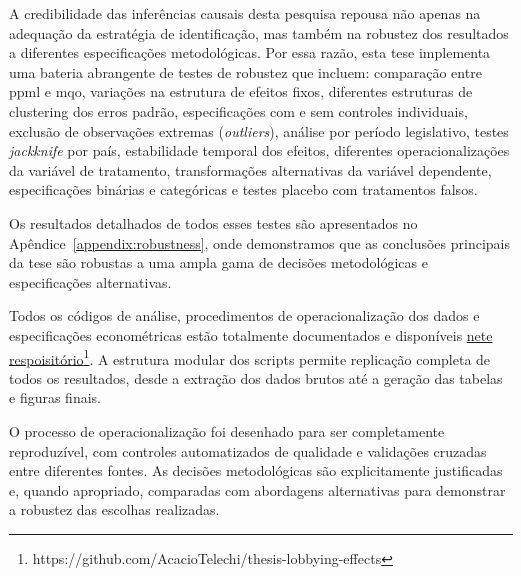 A credibilidade das inferências causais desta pesquisa repousa não apenas na adequação da estratégia de identificação, mas também na robustez dos resultados a diferentes especificações metodológicas. Por essa razão, esta tese implementa uma bateria abrangente de testes de robustez que incluem: comparação entre \acrshort{ppml} e \acrshort{mqo}, variações na estrutura de efeitos fixos, diferentes estruturas de clustering dos erros padrão, especificações com e sem controles individuais, exclusão de observações extremas (\textit{outliers}), análise por período legislativo, testes \textit{jackknife} por país, estabilidade temporal dos efeitos, diferentes operacionalizações da variável de tratamento, transformações alternativas da variável dependente, especificações binárias e categóricas e testes placebo com tratamentos falsos.

Os resultados detalhados de todos esses testes são apresentados no Apêndice~\ref{appendix:robustness}, onde demonstramos que as conclusões principais da tese são robustas a uma ampla gama de decisões metodológicas e especificações alternativas.

Todos os códigos de análise, procedimentos de operacionalização dos dados e especificações econométricas estão totalmente documentados e disponíveis \href{https://github.com/AcacioTelechi/thesis-lobbying-effects}{nete respoisitório}\footnote{https://github.com/AcacioTelechi/thesis-lobbying-effects}. A estrutura modular dos scripts permite replicação completa de todos os resultados, desde a extração dos dados brutos até a geração das tabelas e figuras finais.

O processo de operacionalização foi desenhado para ser completamente reproduzível, com controles automatizados de qualidade e validações cruzadas entre diferentes fontes. As decisões metodológicas são explicitamente justificadas e, quando apropriado, comparadas com abordagens alternativas para demonstrar a robustez das escolhas realizadas.
